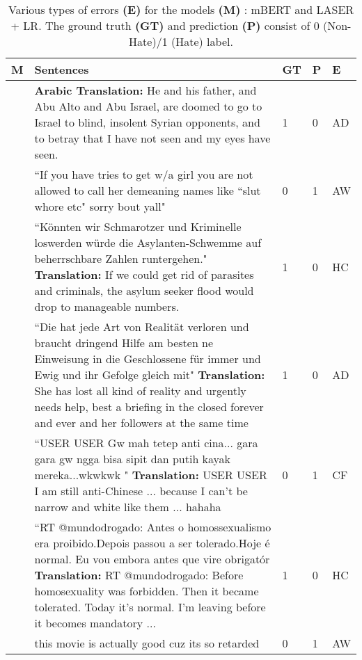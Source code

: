 \documentclass[runningheads]{llncs}
\begin{document}
\begin{table}[!htb]
\centering
\caption{Various types of errors \textbf{(E)} for the models \textbf{(M)} : mBERT and LASER + LR. The ground truth \textbf{(GT)} and prediction \textbf{(P)} consist of 0 (Non-Hate)/1 (Hate) label.} 
\label{tab:mBERT_error}
\begin{tabular}{ M{0.2in} | p{0.8\textwidth} | p{0.05\textwidth} p{0.03\textwidth} p{0.04\textwidth} }
\textbf{M}&\textbf{Sentences} & \textbf{GT} & \textbf{P} & \textbf{E}\\
\hline
& \textbf{Arabic Translation:} He and his father, and Abu Alto and Abu Israel, are doomed to go to Israel to blind, insolent Syrian opponents, and to betray that I have not seen and my eyes have seen. & 1 & 0 & AD \\ 
 &``If you have tries to get w/a girl you are not allowed to call her demeaning names like ``slut whore etc" sorry bout yall"& 0 & 1 & AW\\
&``Könnten wir Schmarotzer und Kriminelle  loswerden würde die Asylanten-Schwemme  auf beherrschbare Zahlen runtergehen." \newline \textbf{Translation:} If we could get rid of parasites and criminals, the  asylum seeker  flood would drop to manageable numbers.
& 1 & 0 & HC\\
\hline \hline
&``Die hat jede Art von Realität verloren und braucht dringend Hilfe am besten ne Einweisung in die Geschlossene für immer und Ewig und ihr Gefolge gleich mit" \newline \textbf{Translation:} She has lost all kind of reality and urgently needs help, best a briefing in the closed forever and ever and her followers at the same time & 1 & 0 & AD\\
&``USER USER Gw mah tetep anti cina... gara gara gw ngga bisa sipit dan putih kayak mereka...wkwkwk " \newline
\textbf{Translation:} USER USER I am still anti-Chinese ... because I can't be narrow  and white like them ... hahaha
& 0 & 1 & CF\\
&``RT @mundodrogado: Antes o homossexualismo era proibido.Depois passou a ser tolerado.Hoje é normal.  Eu vou embora antes que vire obrigatór \newline
\textbf{Translation:} RT @mundodrogado: Before homosexuality was forbidden. Then it  became tolerated. Today it's normal. I'm leaving before it becomes mandatory ...& 1 & 0 & HC  \\
&this movie is actually good cuz its so retarded
& 0 & 1 & AW\\
\hline

\end{tabular}
\end{table}
\end{document}
